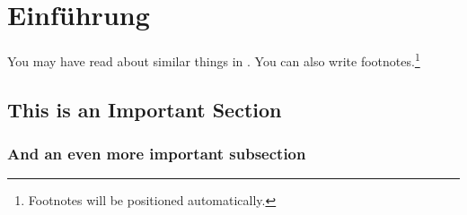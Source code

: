 \chapter{Einführung}\label{ch:intro}

You may have read about similar things in \cite{Goodliffe2007}.
You can also write footnotes.\footnote{Footnotes will be positioned automatically.}
\blindtext

\blindtext

\section{This is an Important Section}
\blindtext

\subsection{And an even more important subsection}
\blindtext
